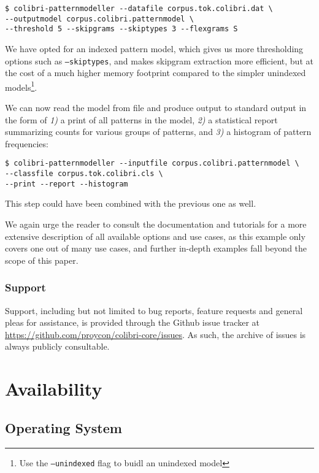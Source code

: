 \documentclass[a4paper,12pt]{article}
\begin{document}
\begin{verbatim}
$ colibri-patternmodeller --datafile corpus.tok.colibri.dat \
--outputmodel corpus.colibri.patternmodel \
--threshold 5 --skipgrams --skiptypes 3 --flexgrams S
\end{verbatim}

We have opted for an indexed pattern model, which gives us more thresholding
options such as \texttt{--skiptypes}, and makes skipgram extraction more
efficient, but at the cost of a much higher memory footprint compared to
the simpler unindexed models\footnote{Use the \texttt{--unindexed} flag to
buidl an unindexed model}.

We can now read the model from file and produce output to standard output in
the form of \emph{1)} a print of all patterns in the model, \emph{2)} a
statistical report summarizing counts for various groups of patterns, and
\emph{3)} a histogram of pattern frequencies:

\begin{verbatim}
$ colibri-patternmodeller --inputfile corpus.colibri.patternmodel \
--classfile corpus.tok.colibri.cls \
--print --report --histogram
\end{verbatim}

This step could have been combined with the previous one as well.

We again urge the reader to consult the documentation and tutorials for a more
extensive description of all available options and use cases, as this example
only covers one out of many use cases, and further in-depth examples fall beyond
the scope of this paper.

\subsubsection{Support} 

Support, including but not limited to bug reports, feature requests and general
pleas for assistance, is provided through the Github issue tracker at
\url{https://github.com/proycon/colibri-core/issues}. As such, the archive of
issues is always publicly consultable. 

\section{Availability}

\subsection{Operating System}
\end{document}
